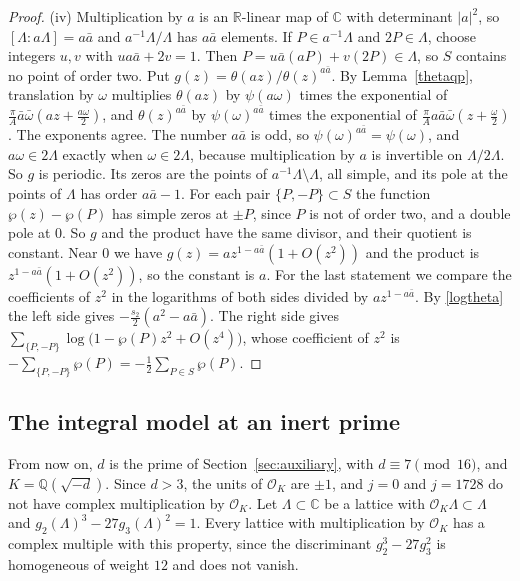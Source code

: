\begin{proof}
(iv) Multiplication by $a$ is an $\mathbb R$-linear map of $\mathbb C$ with determinant $\lvert a\rvert^2$, so $[\Lambda:a\Lambda]=a\bar a$ and $a^{-1}\Lambda/\Lambda$ has $a\bar a$ elements. If $P\in a^{-1}\Lambda$ and $2P\in\Lambda$, choose integers $u,v$ with $ua\bar a+2v=1$. Then $P=u\bar a(aP)+v(2P)\in\Lambda$, so $S$ contains no point of order two. Put $g(z)=\theta(az)/\theta(z)^{a\bar a}$. By Lemma~\ref{thetaqp}, translation by $\omega$ multiplies $\theta(az)$ by $\psi(a\omega)$ times the exponential of $\frac\pi A\bar a\bar\omega(az+\frac{a\omega}2)$, and $\theta(z)^{a\bar a}$ by $\psi(\omega)^{a\bar a}$ times the exponential of $\frac\pi A a\bar a\bar\omega(z+\frac\omega2)$. The exponents agree. The number $a\bar a$ is odd, so $\psi(\omega)^{a\bar a}=\psi(\omega)$, and $a\omega\in2\Lambda$ exactly when $\omega\in2\Lambda$, because multiplication by $a$ is invertible on $\Lambda/2\Lambda$. So $g$ is periodic. Its zeros are the points of $a^{-1}\Lambda\setminus\Lambda$, all simple, and its pole at the points of $\Lambda$ has order $a\bar a-1$. For each pair $\{P,-P\}\subset S$ the function $\wp(z)-\wp(P)$ has simple zeros at $\pm P$, since $P$ is not of order two, and a double pole at $0$. So $g$ and the product have the same divisor, and their quotient is constant. Near $0$ we have $g(z)=az^{1-a\bar a}(1+O(z^2))$ and the product is $z^{1-a\bar a}(1+O(z^2))$, so the constant is $a$. For the last statement we compare the coefficients of $z^2$ in the logarithms of both sides divided by $az^{1-a\bar a}$. By \eqref{logtheta} the left side gives $-\frac{s_2}2(a^2-a\bar a)$. The right side gives $\sum_{\{P,-P\}}\log\big(1-\wp(P)z^2+O(z^4)\big)$, whose coefficient of $z^2$ is $-\sum_{\{P,-P\}}\wp(P)=-\frac12\sum_{P\in S}\wp(P)$.
\end{proof}

\subsection{The integral model at an inert prime}\label{sec:intmodel}

From now on, $d$ is the prime of Section~\ref{sec:auxiliary}, with $d\equiv7\pmod{16}$, and $K=\mathbb Q(\sqrt{-d})$. Since $d>3$, the units of $\mathcal O_K$ are $\pm1$, and $j=0$ and $j=1728$ do not have complex multiplication by $\mathcal O_K$. Let $\Lambda\subset\mathbb C$ be a lattice with $\mathcal O_K\Lambda\subset\Lambda$ and $g_2(\Lambda)^3-27g_3(\Lambda)^2=1$. Every lattice with multiplication by $\mathcal O_K$ has a complex multiple with this property, since the discriminant $g_2^3-27g_3^2$ is homogeneous of weight $12$ and does not vanish.

